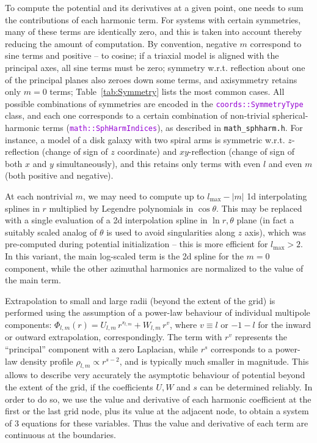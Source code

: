 \documentclass[12pt]{article}
\newcommand{\ttt}[1]{\textcolor{darkviolet}{\texttt{#1}}}
\begin{document}
To compute the potential and its derivatives at a given point, one needs to sum the contributions of each harmonic term. For systems with certain symmetries, many of these terms are identically zero, and this is taken into account thereby reducing the amount of computation. By convention, negative $m$ correspond to sine terms and positive -- to cosine; if a triaxial model is aligned with the principal axes, all sine terms must be zero; symmetry w.r.t. reflection about one of the principal planes also zeroes down some terms, and axisymmetry retains only $m=0$ terms; Table~\ref{tab:Symmetry} lists the most common cases. All possible combinations of symmetries are encoded in the \ttt{coords::SymmetryType} class, and each one corresponds to a certain combination of non-trivial spherical-harmonic terms (\ttt{math::SphHarmIndices}), as described in \texttt{math_sphharm.h}. For instance, a model of a disk galaxy with two spiral arms is symmetric w.r.t. $z$-reflection (change of sign of $z$ coordinate) and $xy$-reflection (change of sign of both $x$ and $y$ simultaneously), and this retains only terms with even $l$ and even $m$ (both positive and negative).

At each nontrivial $m$, we may need to compute up to $l_\mathrm{max}-|m|$ 1d interpolating splines in $r$ multiplied by Legendre polynomials in $\cos\theta$. This may be replaced with a single evaluation of a 2d interpolation spline in $\ln r,\theta$ plane (in fact a suitably scaled analog of $\theta$ is used to avoid singularities along $z$ axis), which was pre-computed during potential initialization -- this is more efficient for $l_\mathrm{max}>2$. In this variant, the main log-scaled term is the 2d spline for the $m=0$ component, while the other azimuthal harmonics are normalized to the value of the main term.

Extrapolation to small and large radii (beyond the extent of the grid) is performed using the assumption of a power-law behaviour of individual multipole components: $\Phi_{l,m}(r) = U_{l,m}\, r^{s_{l,m}} + W_{l,m}\, r^{v}$, where $v\equiv l$ or $-1-l$ for the inward or outward extrapolation, correspondingly. The term with $r^v$ represents the ``principal'' component with a zero Laplacian, while $r^s$ corresponds to a power-law density profile $\rho_{l,m}\propto r^{s-2}$, and is typically much smaller in magnitude. This allows to describe very accurately the asymptotic behaviour of potential beyond the extent of the grid, if the coefficients $U,W$ and $s$ can be determined reliably. In order to do so, we use the value and derivative of each harmonic coefficient at the first or the last grid node, plus its value at the adjacent node, to obtain a system of 3 equations for these variables. Thus the value and derivative of each term are continuous at the boundaries. 
\end{document}
